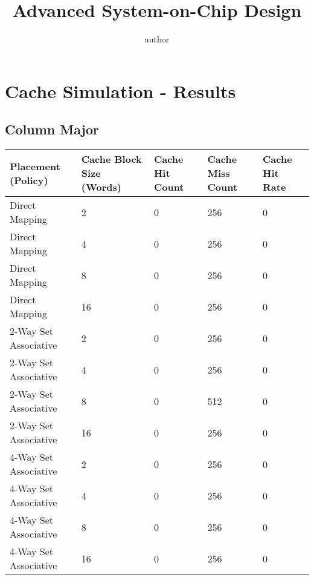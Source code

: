 \documentclass[11pt,a4paper]{article}
\title{Advanced System-on-Chip Design}
\author{author}
\begin{document}


\tableofcontents
\newpage

\section{Cache Simulation - Results}

\subsection{Column Major}
\begin{tabular}{lllll}
\hline %
Placement (Policy) & Cache Block Size (Words) & Cache Hit Count & Cache Miss Count & Cache Hit Rate \\
\hline %
Direct Mapping & 2 & 0 & 256 & 0  \\
Direct Mapping & 4 & 0 & 256 & 0  \\
Direct Mapping & 8 & 0 & 256 & 0  \\
Direct Mapping & 16 & 0 & 256 & 0  \\
2-Way Set Associative & 2 & 0 & 256 & 0 \\
2-Way Set Associative & 4 & 0 & 256 & 0 \\
2-Way Set Associative & 8 & 0 & 512 & 0 \\
2-Way Set Associative & 16 & 0 & 256 & 0 \\
4-Way Set Associative & 2 & 0 & 256 & 0 \\
4-Way Set Associative & 4 & 0 & 256 & 0 \\
4-Way Set Associative & 8 & 0 & 256 & 0 \\
4-Way Set Associative & 16 & 0 & 256 & 0 \\
\hline %
\end{tabular} 
\end{document}
